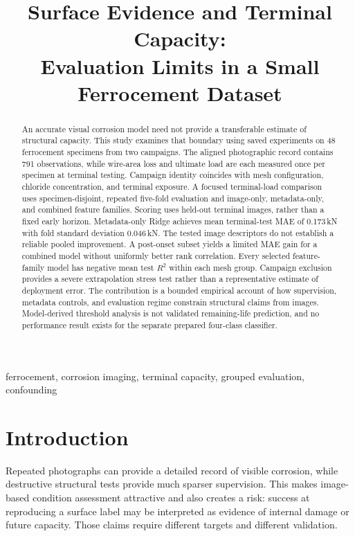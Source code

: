 \documentclass[conference]{IEEEtran}
\title{Surface Evidence and Terminal Capacity:\\Evaluation Limits in a Small Ferrocement Dataset}
\author{\IEEEauthorblockN{Parastoo Hashemi Alvar}\IEEEauthorblockA{Politecnico di Torino\\Turin, Italy}}
\begin{document}
\maketitle
\begin{abstract}
An accurate visual corrosion model need not provide a transferable estimate of structural capacity. This study examines that boundary using saved experiments on 48 ferrocement specimens from two campaigns. The aligned photographic record contains 791 observations, while wire-area loss and ultimate load are each measured once per specimen at terminal testing. Campaign identity coincides with mesh configuration, chloride concentration, and terminal exposure. A focused terminal-load comparison uses specimen-disjoint, repeated five-fold evaluation and image-only, metadata-only, and combined feature families. Scoring uses held-out terminal images, rather than a fixed early horizon. Metadata-only Ridge achieves mean terminal-test MAE of 0.173\,kN with fold standard deviation 0.046\,kN. The tested image descriptors do not establish a reliable pooled improvement. A post-onset subset yields a limited MAE gain for a combined model without uniformly better rank correlation. Every selected feature-family model has negative mean test $R^2$ within each mesh group. Campaign exclusion provides a severe extrapolation stress test rather than a representative estimate of deployment error. The contribution is a bounded empirical account of how supervision, metadata controls, and evaluation regime constrain structural claims from images. Model-derived threshold analysis is not validated remaining-life prediction, and no performance result exists for the separate prepared four-class classifier.
\end{abstract}
\begin{IEEEkeywords}
ferrocement, corrosion imaging, terminal capacity, grouped evaluation, confounding
\end{IEEEkeywords}

\section{Introduction}
Repeated photographs can provide a detailed record of visible corrosion, while destructive structural tests provide much sparser supervision. This makes image-based condition assessment attractive and also creates a risk: success at reproducing a surface label may be interpreted as evidence of internal damage or future capacity. Those claims require different targets and different validation.
\end{document}
